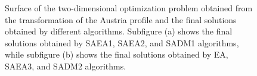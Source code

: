 			\begin{figure}
				\centering
				 \hspace{.05\textwidth}
				\caption[Surface of the two-dimensional optimization problem obtained from the transformation of the Austria profile and the final solutions obtained by different algorithms.]{Surface of the two-dimensional optimization problem obtained from the transformation of the Austria profile and the final solutions obtained by different algorithms. Subfigure (a) shows the final solutions obtained by SAEA1, SAEA2, and SADM1 algorithms, while subfigure (b) shows the final solutions obtained by EA, SAEA3, and SADM2 algorithms.}
				\label{fig:results:casestudy:austria:surface}
			\end{figure}
		
